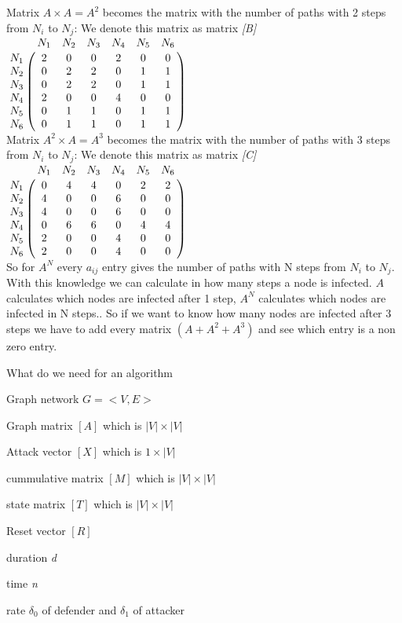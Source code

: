 Matrix $A \times A = A^{2}$ becomes the matrix with the number of paths with 2 steps from $N_{i}$ to $N_{j}$: We denote this matrix as matrix \textit{[B]}\\


$
\bordermatrix{
         & N_1		& N_2	& N_3	& N_4 	& N_5	&N_6     \cr
    N_1   & 2		& 0		& 0		& 2		& 0		& 0	     \cr
    N_2   & 0		& 2		& 2		& 0		& 1		& 1	     \cr
    N_3   & 0		& 2		& 2		& 0		& 1		& 1	     \cr
    N_4   & 2		& 0		& 0		& 4		& 0		& 0	     \cr
	N_5   & 0		& 1		& 1		& 0		& 1		& 1	     \cr
	N_6   & 0		& 1		& 1		& 0		& 1		& 1	     \cr
}$
\\

Matrix $A^{2} \times A = A^{3}$ becomes the matrix with the number of paths with 3 steps from $N_{i}$ to $N_{j}$: We denote this matrix as matrix \textit{[C]}\\


$
\bordermatrix{
         & N_1		& N_2	& N_3	& N_4 	& N_5	&N_6     \cr
    N_1   & 0		& 4		& 4		& 0		& 2		& 2	     \cr
    N_2   & 4		& 0		& 0		& 6		& 0		& 0	     \cr
    N_3   & 4		& 0		& 0		& 6		& 0		& 0	     \cr
    N_4   & 0		& 6		& 6		& 0		& 4		& 4	     \cr
	N_5   & 2		& 0		& 0		& 4		& 0		& 0	     \cr
	N_6   & 2		& 0		& 0		& 4		& 0		& 0	     \cr
}$ 
\\

So for $A^{N}$ every $a_{ij}$ entry gives the number of paths with N steps from $N_{i}$ to $N_{j}$.\\

With this knowledge we can calculate in how many steps a node is infected. $A$ calculates which nodes are infected after 1 step, $A^{N}$ calculates which nodes are infected in N steps.. So if we want to know how many nodes are infected after 3 steps we have to add every matrix $(A + A^{2} + A^{3}) $ and see which entry is a non zero entry. 

What do we need for an algorithm
\begin{description}
\item Graph network $G = < V, E>$
\item Graph matrix $[A]$ which is $|V| \times |V| $
\item Attack vector $[X]$ which is $1 \times |V|$
\item cummulative matrix $[M]$ which is $|V| \times |V|$
\item state matrix $[T]$  which is $|V| \times |V|$
\item Reset vector $[R]$
\item duration \textit{d}
\item time \textit{n}
\item rate $\delta _{0}$ of defender and $\delta _{1}$ of attacker
\end{description}



